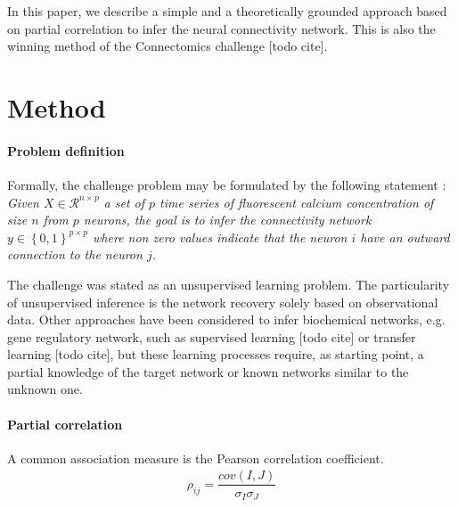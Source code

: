 \documentclass[wcp]{jmlr}
\begin{document}
In this paper, we describe a simple and a theoretically grounded approach
based on partial correlation to infer the neural connectivity network.
This is also the winning method of the Connectomics challenge [todo cite].

\section{Method}

\paragraph{Problem definition\\}


Formally, the challenge problem may be formulated by the following statement :
\textit{Given $X \in \mathcal{R}^{n \times p}$  a set of $p$ time series of fluorescent
calcium concentration of size $n$ from $p$ neurons, the goal is to infer the
connectivity network $y \in \left\{0, 1\right\}^{p \times p}$ where
non zero values indicate that the neuron $i$ have an outward connection to
the neuron $j$.}


The challenge was stated as an unsupervised learning problem. The particularity
of unsupervised inference is the network recovery solely based on observational
data. Other approaches have been considered to infer biochemical networks, e.g.
gene regulatory network, such as supervised learning [todo cite] or transfer
learning [todo cite], but these learning processes require, as starting point,
a partial knowledge of the target network or known networks similar to the
unknown one.

\paragraph{Partial correlation\\}

A common association measure is the Pearson correlation coefficient.
\begin{align}
\rho_{ij} = \dfrac{cov(I,J)}{\sigma_I \sigma_J}
\end{align}
\end{document}
